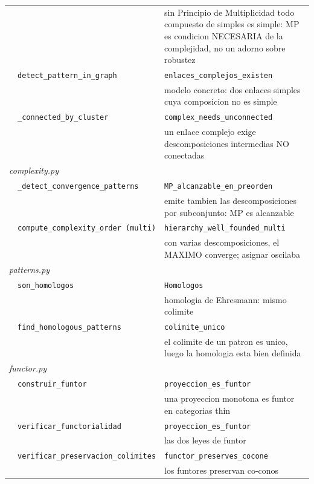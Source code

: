 \documentclass[11pt,a4paper]{article}
\begin{document}
\begin{longtable}{@{}p{1.2cm}p{5.9cm}p{7.2cm}@{}}
  &  & \footnotesize sin Principio de Multiplicidad todo compuesto de simples es simple: MP es condicion NECESARIA de la complejidad, no un adorno sobre robustez \\
  & \texttt{detect\_pattern\_in\_graph} & \texttt{enlaces\_complejos\_existen} \\
  &  & \footnotesize modelo concreto: dos enlaces simples cuya composicion no es simple \\
  & \texttt{\_connected\_by\_cluster} & \texttt{complex\_needs\_unconnected} \\
  &  & \footnotesize un enlace complejo exige descomposiciones intermedias NO conectadas \\
\midrule \multicolumn{3}{l}{\textit{complexity.py}} \\
  & \texttt{\_detect\_convergence\_patterns} & \texttt{MP\_alcanzable\_en\_preorden} \\
  &  & \footnotesize emite tambien las descomposiciones por subconjunto: MP es alcanzable \\
  & \texttt{compute\_complexity\_order (multi)} & \texttt{hierarchy\_well\_founded\_multi} \\
  &  & \footnotesize con varias descomposiciones, el MAXIMO converge; asignar oscilaba \\
\midrule \multicolumn{3}{l}{\textit{patterns.py}} \\
  & \texttt{son\_homologos} & \texttt{Homologos} \\
  &  & \footnotesize homologia de Ehresmann: mismo colimite \\
  & \texttt{find\_homologous\_patterns} & \texttt{colimite\_unico} \\
  &  & \footnotesize el colimite de un patron es unico, luego la homologia esta bien definida \\
\midrule \multicolumn{3}{l}{\textit{functor.py}} \\
  & \texttt{construir\_funtor} & \texttt{proyeccion\_es\_funtor} \\
  &  & \footnotesize una proyeccion monotona es funtor en categorias thin \\
  & \texttt{verificar\_functorialidad} & \texttt{proyeccion\_es\_funtor} \\
  &  & \footnotesize las dos leyes de funtor \\
  & \texttt{verificar\_preservacion\_colimites} & \texttt{functor\_preserves\_cocone} \\
  &  & \footnotesize los funtores preservan co-conos \\

\end{longtable}
\end{document}
